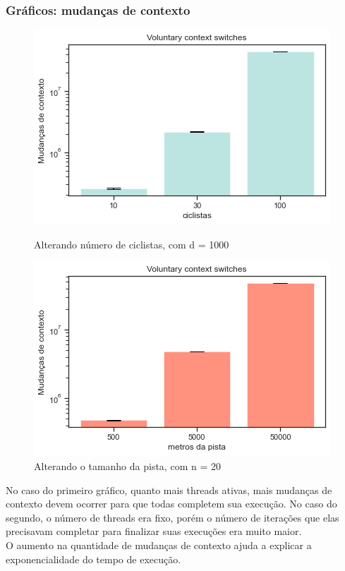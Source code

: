 \documentclass{beamer}
\begin{document}
\begin{frame}
\frametitle{Gráficos: mudanças de contexto}
\begin{figure}[!htb]

%
  \includegraphics[width=\linewidth]{imgs/ciclistas_contexto}
  \caption{{\footnotesize Alterando número de ciclistas, com d = 1000}}\label{fig:awesome_image3}
\endminipage
{}%
  \includegraphics[width=\linewidth]{imgs/pistas_contexto}
  \caption{{\footnotesize Alterando o tamanho da pista, com n = 20}}\label{fig:awesome_image3}
\endminipage
\end{figure}

\begin{small} 


No caso do primeiro gráfico, quanto mais threads ativas, mais mudanças de contexto devem ocorrer para que todas completem sua execução. No caso do segundo, o número de threads era fixo, porém o número de iterações que elas precisavam completar para finalizar suas execuções era muito maior. \\

O aumento na quantidade de mudanças de contexto ajuda a explicar a exponencialidade do tempo de execução.

\end{small} 



\end{frame}
\end{document}
